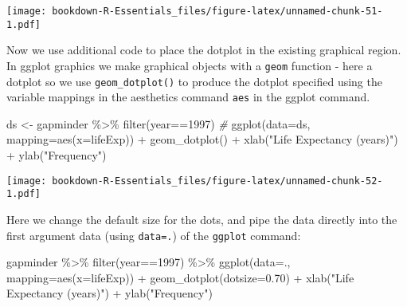 \documentclass[
]{book}
\newenvironment{Shaded}{\begin{snugshade}}{\end{snugshade}}
\newcommand{\AttributeTok}[1]{\textcolor[rgb]{0.77,0.63,0.00}{#1}}
\newcommand{\CommentTok}[1]{\textcolor[rgb]{0.56,0.35,0.01}{\textit{#1}}}
\newcommand{\DecValTok}[1]{\textcolor[rgb]{0.00,0.00,0.81}{#1}}
\newcommand{\FloatTok}[1]{\textcolor[rgb]{0.00,0.00,0.81}{#1}}
\newcommand{\FunctionTok}[1]{\textcolor[rgb]{0.00,0.00,0.00}{#1}}
\newcommand{\NormalTok}[1]{#1}
\newcommand{\OtherTok}[1]{\textcolor[rgb]{0.56,0.35,0.01}{#1}}
\newcommand{\SpecialCharTok}[1]{\textcolor[rgb]{0.00,0.00,0.00}{#1}}
\newcommand{\StringTok}[1]{\textcolor[rgb]{0.31,0.60,0.02}{#1}}
\begin{document}
\texttt{[image: bookdown-R-Essentials\_files/figure-latex/unnamed-chunk-51-1.pdf]}

Now we use additional code to place the dotplot in the existing graphical region. In ggplot graphics we make graphical objects with a \texttt{geom} function - here a dotplot so we use \texttt{geom\_dotplot()} to produce the dotplot specified using the variable mappings in the aesthetics command \texttt{aes} in the ggplot command.

\begin{Shaded}
\begin{Highlighting}[]
\NormalTok{ds }\OtherTok{\textless{}{-}}\NormalTok{ gapminder }\SpecialCharTok{\%\textgreater{}\%} 
  \FunctionTok{filter}\NormalTok{(year}\SpecialCharTok{==}\DecValTok{1997}\NormalTok{) }
\CommentTok{\#}
\FunctionTok{ggplot}\NormalTok{(}\AttributeTok{data=}\NormalTok{ds, }\AttributeTok{mapping=}\FunctionTok{aes}\NormalTok{(}\AttributeTok{x=}\NormalTok{lifeExp)) }\SpecialCharTok{+} 
  \FunctionTok{geom\_dotplot}\NormalTok{() }\SpecialCharTok{+} 
  \FunctionTok{xlab}\NormalTok{(}\StringTok{"Life Expectancy (years)"}\NormalTok{) }\SpecialCharTok{+} \FunctionTok{ylab}\NormalTok{(}\StringTok{"Frequency"}\NormalTok{)}
\end{Highlighting}
\end{Shaded}

\texttt{[image: bookdown-R-Essentials\_files/figure-latex/unnamed-chunk-52-1.pdf]}

Here we change the default size for the dots, and pipe the data directly into the first argument data (using \texttt{data=.}) of the \texttt{ggplot} command:

\begin{Shaded}
\begin{Highlighting}[]
\NormalTok{gapminder }\SpecialCharTok{\%\textgreater{}\%} 
  \FunctionTok{filter}\NormalTok{(year}\SpecialCharTok{==}\DecValTok{1997}\NormalTok{) }\SpecialCharTok{\%\textgreater{}\%}
\FunctionTok{ggplot}\NormalTok{(}\AttributeTok{data=}\NormalTok{., }\AttributeTok{mapping=}\FunctionTok{aes}\NormalTok{(}\AttributeTok{x=}\NormalTok{lifeExp)) }\SpecialCharTok{+} 
  \FunctionTok{geom\_dotplot}\NormalTok{(}\AttributeTok{dotsize=}\FloatTok{0.70}\NormalTok{) }\SpecialCharTok{+} 
  \FunctionTok{xlab}\NormalTok{(}\StringTok{"Life Expectancy (years)"}\NormalTok{) }\SpecialCharTok{+} \FunctionTok{ylab}\NormalTok{(}\StringTok{"Frequency"}\NormalTok{)}
\end{Highlighting}
\end{Shaded}
\end{document}
